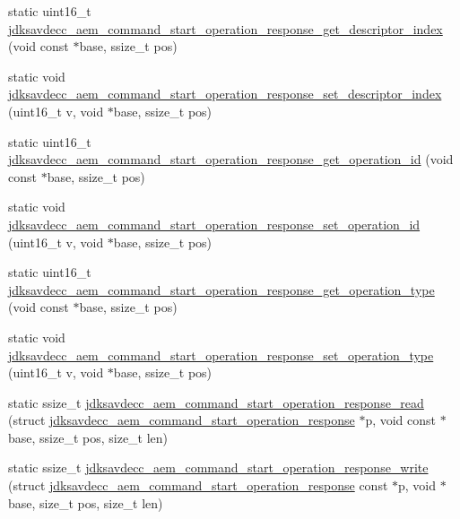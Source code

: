 \begin{DoxyCompactItemize}
\item 
static uint16\+\_\+t \hyperlink{group__command__start__operation__response_gad4092013dd41680f02f44140d179eb58}{jdksavdecc\+\_\+aem\+\_\+command\+\_\+start\+\_\+operation\+\_\+response\+\_\+get\+\_\+descriptor\+\_\+index} (void const $\ast$base, ssize\+\_\+t pos)
\item 
static void \hyperlink{group__command__start__operation__response_gad7c39fedc3c3e11e234a77df9fccc1aa}{jdksavdecc\+\_\+aem\+\_\+command\+\_\+start\+\_\+operation\+\_\+response\+\_\+set\+\_\+descriptor\+\_\+index} (uint16\+\_\+t v, void $\ast$base, ssize\+\_\+t pos)
\item 
static uint16\+\_\+t \hyperlink{group__command__start__operation__response_ga6007a35af372c037de0a8710ffbd1b64}{jdksavdecc\+\_\+aem\+\_\+command\+\_\+start\+\_\+operation\+\_\+response\+\_\+get\+\_\+operation\+\_\+id} (void const $\ast$base, ssize\+\_\+t pos)
\item 
static void \hyperlink{group__command__start__operation__response_gacb9f0e95daaa8e29e090a42d12b2ec3a}{jdksavdecc\+\_\+aem\+\_\+command\+\_\+start\+\_\+operation\+\_\+response\+\_\+set\+\_\+operation\+\_\+id} (uint16\+\_\+t v, void $\ast$base, ssize\+\_\+t pos)
\item 
static uint16\+\_\+t \hyperlink{group__command__start__operation__response_ga4aef067254d4ccf768daa8903a0a3398}{jdksavdecc\+\_\+aem\+\_\+command\+\_\+start\+\_\+operation\+\_\+response\+\_\+get\+\_\+operation\+\_\+type} (void const $\ast$base, ssize\+\_\+t pos)
\item 
static void \hyperlink{group__command__start__operation__response_ga50fa1a8e236208fc3770e1db2cdf595f}{jdksavdecc\+\_\+aem\+\_\+command\+\_\+start\+\_\+operation\+\_\+response\+\_\+set\+\_\+operation\+\_\+type} (uint16\+\_\+t v, void $\ast$base, ssize\+\_\+t pos)
\item 
static ssize\+\_\+t \hyperlink{group__command__start__operation__response_gad6d5107768b710fefada454e6ee9d98c}{jdksavdecc\+\_\+aem\+\_\+command\+\_\+start\+\_\+operation\+\_\+response\+\_\+read} (struct \hyperlink{structjdksavdecc__aem__command__start__operation__response}{jdksavdecc\+\_\+aem\+\_\+command\+\_\+start\+\_\+operation\+\_\+response} $\ast$p, void const $\ast$base, ssize\+\_\+t pos, size\+\_\+t len)
\item 
static ssize\+\_\+t \hyperlink{group__command__start__operation__response_gaa2a809cfffdbb660ff1e912ed3c8ad0f}{jdksavdecc\+\_\+aem\+\_\+command\+\_\+start\+\_\+operation\+\_\+response\+\_\+write} (struct \hyperlink{structjdksavdecc__aem__command__start__operation__response}{jdksavdecc\+\_\+aem\+\_\+command\+\_\+start\+\_\+operation\+\_\+response} const $\ast$p, void $\ast$base, size\+\_\+t pos, size\+\_\+t len)
\end{DoxyCompactItemize}


